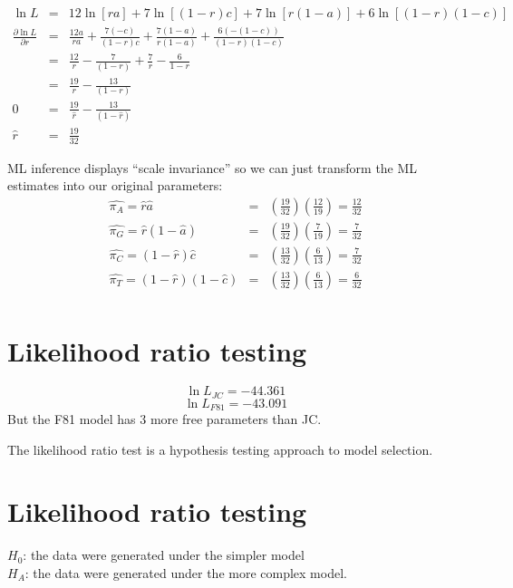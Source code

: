 \documentclass[landscape]{foils}
\begin{document}
\myNewSlide
\begin{eqnarray*}
	\ln L & = & 12 \ln\left[ra\right] + 7 \ln\left[(1-r)c\right] + 7 \ln\left[r(1-a)\right] + 6 \ln\left[(1-r)(1-c)\right]  \\
	\frac{\partial \ln L}{\partial r} & = &\frac{12 a}{ra} + \frac{7(-c)}{(1-r)c} + \frac{7(1-a)}{r(1-a)} + \frac{6(-(1-c))}{(1-r)(1-c)} \\
	& = & \frac{12}{r} -\frac{7}{(1-r)} + \frac{7}{r} - \frac{6}{1-r}\\
	& = & \frac{19}{r} -\frac{13}{(1-r)}\\
	 0 & = & \frac{19}{\hat{r}} -\frac{13}{(1-\hat{r})}  \\
	 \hat{r} & = & \frac{19}{32}
\end{eqnarray*}


\myNewSlide
ML inference displays ``scale invariance'' so we can just transform the ML estimates into our original parameters:
\begin{eqnarray*}
	\widehat{\pi_A} = \hat{r}\hat{a}  & = & \left(\frac{19}{32}\right)\left(\frac{12}{19}\right) = \frac{12}{32} \\
	\widehat{\pi_G}  = \hat{r}(1-\hat{a})& = & \left(\frac{19}{32}\right)\left(\frac{7}{19}\right) = \frac{7}{32} \\
	\widehat{\pi_C}  =  (1-\hat{r})\hat{c} & = & \left(\frac{13}{32}\right)\left(\frac{6}{13}\right) = \frac{7}{32} \\
	\widehat{\pi_T}  =  (1-\hat{r})(1-\hat{c})& = & \left(\frac{13}{32}\right)\left(\frac{6}{13}\right) = \frac{6}{32} \\
\end{eqnarray*}

\myNewSlide
\section*{Likelihood ratio testing}
\large
$$\ln L_{JC} = -44.361 $$
$$\ln L_{F81} = -43.091 $$
But the F81 model has 3 more free parameters than JC.

The likelihood ratio test is a hypothesis testing approach to model selection.


\myNewSlide
\section*{Likelihood ratio testing}
$H_0$: the data were generated under the simpler model\\
$H_A$: the data were generated under the more complex model. \par
\end{document}
